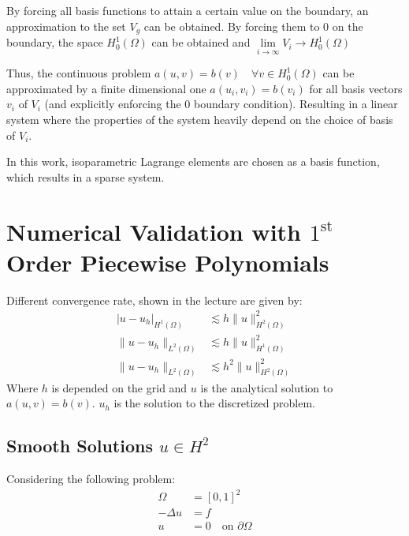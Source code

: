 \documentclass[11pt,a4paper]{article}
\begin{document}
By forcing all basis functions to attain a certain value on the boundary, an
approximation to the set $V_g$ can be obtained. By forcing them to 0 on the
boundary, the space $H^1_0(\Omega)$ can be obtained and
$\lim\limits_{i\to\infty}V_i \to H^1_0(\Omega)$

Thus, the continuous problem $a(u,v) = b(v) \quad \forall v \in H^1_0(\Omega)$
can be approximated by a finite dimensional one $a(u_i,v_i) = b(v_i)$ for all
basis vectors $v_i$ of $V_i$ (and explicitly enforcing the 0 boundary condition).
Resulting in a linear system where the properties of the system heavily depend
on the choice of basis of $V_i$.

In this work, isoparametric Lagrange elements are chosen as a basis function,
which results in a sparse system.

\section*{Numerical Validation with $1^{\text{st}}$ Order Piecewise Polynomials}
Different convergence rate, shown in the lecture are given by:
\begin{equation}
  \begin{split}
    \left|u-u_h\right|_{H^1(\Omega)} &\lesssim h \lVert u\rVert^2_{H^2(\Omega)}\\
    \lVert u - u_h \rVert_{L^2(\Omega)} &\lesssim h\lVert u\rVert^2_{H^1(\Omega)}\\
    \lVert u - u_h \rVert_{L^2(\Omega)} &\lesssim h^2\lVert u\rVert^2_{H^2(\Omega)}
  \end{split}
\end{equation}
Where $h$ is depended on the grid and $u$ is the analytical solution to $a(u,v) = b(v)$.
$u_h$ is the solution to the discretized problem.

\subsection*{Smooth Solutions $u \in H^2$}
Considering the following problem:
\begin{equation}
  \label{eq:smooth_poisson_prob}
  \begin{split}
    \Omega &= \left[0,1\right]^2\\
    -\Delta u &= f\\
    u &= 0 \quad \text{on } \partial \Omega\\
  \end{split}
\end{equation}
\end{document}
